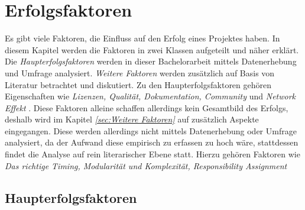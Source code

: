 \chapter{Erfolgsfaktoren}

\noindent
Es gibt viele Faktoren, die Einfluss auf den Erfolg eines Projektes haben. 
In diesem Kapitel werden die Faktoren in zwei Klassen aufgeteilt und näher erklärt.
Die \textit{Haupterfolgsfaktoren} werden in dieser Bachelorarbeit mittels Datenerhebung und
Umfrage analysiert. 
\textit{Weitere Faktoren} werden zusätzlich auf Basis von Literatur betrachtet und diskutiert.
Zu den Haupterfolgsfaktoren gehören Eigenschaften wie \textit{Lizenzen, Qualität, Dokumentation, Community} 
und \textit{Network Effekt} .
Diese Faktoren alleine schaffen allerdings kein Gesamtbild des Erfolgs, deshalb wird im Kapitel 
\textit{\ref{sec:Weitere Faktoren}} auf zusätzlich Aspekte eingegangen.
Diese werden allerdings nicht mittels Datenerhebung oder Umfrage analysiert, da der Aufwand
diese empirisch zu erfassen zu hoch wäre, stattdessen findet die Analyse auf rein literarischer Ebene statt. 
Hierzu gehören Faktoren wie \textit{Das richtige Timing, Modularität und Komplexität, Responsibility
Assignment} 


\section{Haupterfolgsfaktoren} \label{sec:Haupterfolgsfaktoren}







